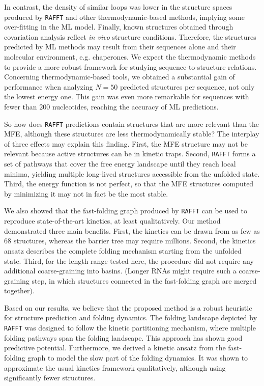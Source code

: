In contrast, the density of similar loops was lower in the structure spaces produced by \texttt{RAFFT} and other thermodynamic-based methods, implying some over-fitting in the \ac{ML} model. Finally, known structures obtained through covariation analysis reflect \textit{in vivo} structure conditions. Therefore, the structures predicted by \ac{ML} methods may result from their sequences alone and their molecular environment, e.g. chaperones. We expect the thermodynamic methods to provide a more robust framework for studying sequence-to-structure relations.
Concerning thermodynamic-based tools, we obtained a substantial gain of performance when analyzing \(N=50\) predicted structures per sequence, not only the lowest energy one. This gain was even more remarkable for sequences with fewer than $200$ nucleotides, reaching the accuracy of \ac{ML} predictions. 

So how does \texttt{RAFFT} predictions contain structures that are more relevant than the \ac{MFE}, although these structures are less thermodynamically stable? The interplay of three effects may explain this finding. First, the \ac{MFE} structure may not be relevant because active structures can be in kinetic traps. Second, \texttt{RAFFT} forms a set of pathways that cover the free energy landscape until they reach local minima, yielding multiple long-lived structures accessible from the unfolded state. Third, the energy function is not perfect, so that the \ac{MFE} structures computed by minimizing it may not in fact be the most stable. 

We also showed that the fast-folding graph produced by \texttt{RAFFT} can be used to reproduce state-of-the-art kinetics, at least qualitatively. Our method demonstrated three main benefits. First, the kinetics can be drawn from as few as $68$ structures, whereas the barrier tree may require millions. Second, the kinetics ansatz describes the complete folding mechanism starting from the unfolded state. Third, for the length range tested here, the procedure did not require any additional coarse-graining into basins. (Longer \acp{RNA} might require such a coarse-graining step, in which structures connected in the fast-folding graph are merged together).

Based on our results, we believe that the proposed method is a robust heuristic for structure prediction and folding dynamics. The folding landscape depicted by \texttt{RAFFT} was designed to follow the kinetic partitioning mechanism, where multiple folding pathways span the folding landscape. This approach has shown good predictive potential. Furthermore, we derived a kinetic ansatz from the fast-folding graph to model the slow part of the folding dynamics. It was shown to approximate the usual kinetics framework qualitatively, although using significantly fewer structures. 

